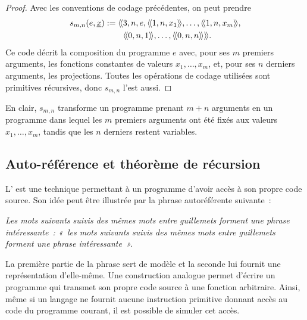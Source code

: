 \begin{proof}
Avec les conventions de codage précédentes, on peut prendre
\[
\begin{aligned}
s_{m,n}(e,\underline{x})
 :=\dbllangle
 &3,n,e,
 \dbllangle1,n,x_1\dblrangle,\ldots,
 \dbllangle1,n,x_m\dblrangle,\\
 &\dbllangle0,n,1\dblrangle,\ldots,
 \dbllangle0,n,n\dblrangle
 \dblrangle.
\end{aligned}
\]
Ce code décrit la composition du programme $e$ avec, pour ses $m$
premiers arguments, les fonctions constantes de valeurs
$x_1,\ldots,x_m$, et, pour ses $n$ derniers arguments, les projections.
Toutes les opérations de codage utilisées sont primitives récursives,
donc $s_{m,n}$ l'est aussi.
\end{proof}

En clair, $s_{m,n}$ transforme un programme prenant $m+n$ arguments en
un programme dans lequel les $m$ premiers arguments ont été fixés aux
valeurs $x_1,\ldots,x_m$, tandis que les $n$ derniers restent variables.

\subsection{Auto-référence et théorème de récursion}
\label{subsection-kleene-recursion-theorem-pr}

\thingy L' est une technique
permettant à un programme d'avoir accès à son propre code source.  Son
idée peut être illustrée par la phrase autoréférente suivante :

\begin{center}
\emph{Les mots suivants suivis des mêmes mots entre guillemets forment
une phrase intéressante : « les mots suivants suivis des mêmes mots
entre guillemets forment une phrase intéressante ».}
\end{center}

La première partie de la phrase sert de modèle et la seconde lui
fournit une représentation d'elle-même.  Une construction analogue
permet d'écrire un programme qui transmet son propre code source à une
fonction arbitraire.  Ainsi, même si un langage ne fournit aucune
instruction primitive donnant accès au code du programme courant, il
est possible de simuler cet accès.


